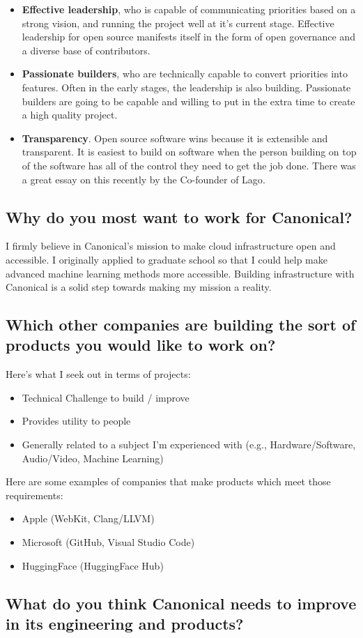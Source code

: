 \documentclass{article}
\begin{document}
\begin{itemize}
  \item \textbf{Effective leadership}, who is capable of communicating
        priorities based on a strong vision, and running the project well at it's
        current stage. Effective leadership for open source manifests itself in the
        form of open governance and a diverse base of contributors.


  \item \textbf{Passionate builders}, who are technically capable to convert
        priorities into features. Often in the early stages, the leadership is also
        building. Passionate builders are going to be capable and willing to put in
        the extra time to create a high quality project.

  \item \textbf{Transparency}. Open source software wins because it is
        extensible and transparent. It is easiest to build on software when the
        person building on top of the software has all of the control they need to
        get the job done. There was a great essay on this recently by the Co-founder
        of Lago\cite{oss_cheap}.
\end{itemize}

\subsection{Why do you most want to work for Canonical?}


I firmly believe in Canonical's mission to make cloud infrastructure open and
accessible. I originally applied to graduate school so that I could help make
advanced machine learning methods more accessible. Building infrastructure with
Canonical is a solid step towards making my mission a reality.

\subsection{Which other companies are building the sort of products you would
  like to work on?}
Here's what I seek out in terms of projects:
\begin{itemize}
  \item Technical Challenge to build / improve
  \item Provides utility to people
  \item Generally related to a subject I'm experienced with (e.g., Hardware/Software, Audio/Video, Machine Learning)
\end{itemize}
Here are some examples of companies that make products which meet those
requirements:
\begin{itemize}
  \item Apple (WebKit, Clang/LLVM)
  \item Microsoft (GitHub, Visual Studio Code)
  \item HuggingFace (HuggingFace Hub)
\end{itemize} \subsection{What do you think Canonical needs to improve in its
  engineering and products?}
\end{document}
